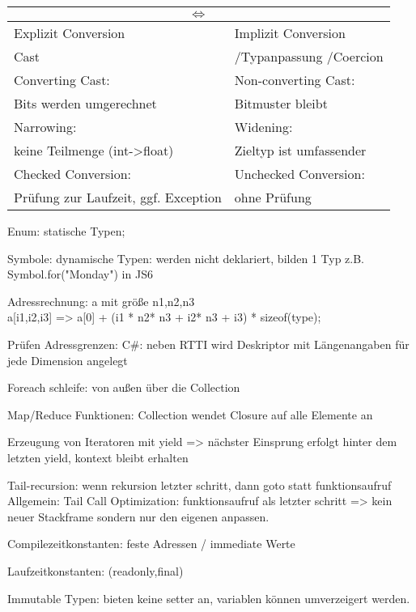 \begin{tabular}{|l|l|}
\hline
\multicolumn{2}{|c|}{$\Leftrightarrow$}\\
\hline
Explizit Conversion  & Implizit Conversion \\
Cast &/Typanpassung /Coercion  \\
\hline
Converting Cast:  & Non-converting Cast: \\
Bits werden umgerechnet & Bitmuster bleibt \\
\hline
Narrowing:  & Widening:  \\
keine Teilmenge (int->float)&Zieltyp ist umfassender\\
\hline
Checked Conversion:   &Unchecked Conversion:  \\
Prüfung zur Laufzeit, ggf. Exception &ohne Prüfung\\
\hline
\end{tabular}

Enum: statische Typen;

Symbole: dynamische Typen: werden nicht deklariert, bilden 1 Typ z.B. Symbol.for("Monday") in JS6


Adressrechnung: a mit größe n1,n2,n3 \\
a[i1,i2,i3] =>  a[0] + (i1 * n2* n3 + i2* n3 + i3) * sizeof(type);

Prüfen Adressgrenzen: 
C\#: neben RTTI wird Deskriptor mit Längenangaben für jede Dimension angelegt

Foreach schleife: von außen über die Collection

Map/Reduce Funktionen: Collection wendet Closure auf alle Elemente an

Erzeugung von Iteratoren mit yield => nächster Einsprung erfolgt hinter dem letzten yield, kontext bleibt erhalten

Tail-recursion: wenn rekursion letzter schritt, dann goto statt funktionsaufruf\\
Allgemein: Tail Call Optimization: funktionsaufruf als letzter schritt => kein neuer Stackframe sondern nur den eigenen anpassen.



Compilezeitkonstanten: feste Adressen / immediate Werte

Laufzeitkonstanten: (readonly,final)

Immutable Typen: bieten keine setter an, variablen können umverzeigert werden.

